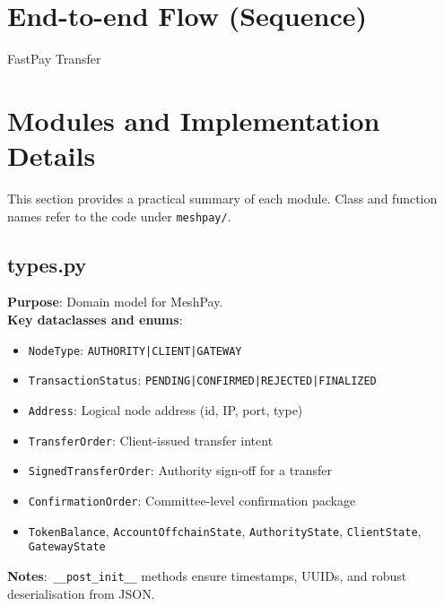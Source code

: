 \documentclass[11pt,a4paper]{article}
\begin{document}
\section{End-to-end Flow (Sequence)}
\begin{center}
\begin{msc}{FastPay Transfer}
  \setlength{\instdist}{3.5cm}





\end{msc}
\end{center}

\section{Modules and Implementation Details}
This section provides a practical summary of each module. Class and function names refer to the code under \texttt{meshpay/}.

\subsection{types.py}
\textbf{Purpose}: Domain model for MeshPay.\\
\textbf{Key dataclasses and enums}:
\begin{itemize}[noitemsep]
  \item \texttt{NodeType}: \texttt{AUTHORITY|CLIENT|GATEWAY}
  \item \texttt{TransactionStatus}: \texttt{PENDING|CONFIRMED|REJECTED|FINALIZED}
  \item \texttt{Address}: Logical node address (id, IP, port, type)
  \item \texttt{TransferOrder}: Client-issued transfer intent
  \item \texttt{SignedTransferOrder}: Authority sign-off for a transfer
  \item \texttt{ConfirmationOrder}: Committee-level confirmation package
  \item \texttt{TokenBalance}, \texttt{AccountOffchainState}, \texttt{AuthorityState}, \texttt{ClientState}, \texttt{GatewayState}
\end{itemize}
\textbf{Notes}:\ \texttt{\_\_post\_init\_\_} methods ensure timestamps, UUIDs, and robust deserialisation from JSON.
\end{document}
